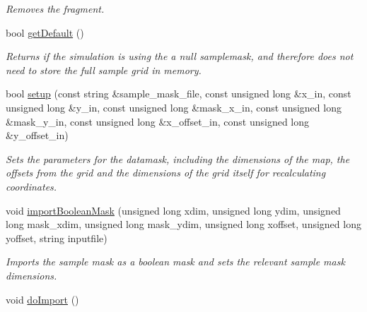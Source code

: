 \begin{DoxyCompactItemize}
\begin{DoxyCompactList}\small\item\em Removes the fragment. \end{DoxyCompactList}\item 
bool \hyperlink{class_data_mask_a093364b6da9442f7c4945b5a06cfe3af}{get\+Default} ()
\begin{DoxyCompactList}\small\item\em Returns if the simulation is using the a null samplemask, and therefore does not need to store the full sample grid in memory. \end{DoxyCompactList}\item 
bool \hyperlink{class_data_mask_a73922a90e7f491ec3dcf90fdd400fdf8}{setup} (const string \&sample\+\_\+mask\+\_\+file, const unsigned long \&x\+\_\+in, const unsigned long \&y\+\_\+in, const unsigned long \&mask\+\_\+x\+\_\+in, const unsigned long \&mask\+\_\+y\+\_\+in, const unsigned long \&x\+\_\+offset\+\_\+in, const unsigned long \&y\+\_\+offset\+\_\+in)
\begin{DoxyCompactList}\small\item\em Sets the parameters for the datamask, including the dimensions of the map, the offsets from the grid and the dimensions of the grid itself for recalculating coordinates. \end{DoxyCompactList}\item 
void \hyperlink{class_data_mask_a819eacf6968b0384a0221599dac09122}{import\+Boolean\+Mask} (unsigned long xdim, unsigned long ydim, unsigned long mask\+\_\+xdim, unsigned long mask\+\_\+ydim, unsigned long xoffset, unsigned long yoffset, string inputfile)
\begin{DoxyCompactList}\small\item\em Imports the sample mask as a boolean mask and sets the relevant sample mask dimensions. \end{DoxyCompactList}\item 
void \hyperlink{class_data_mask_a85f7b85bb4ac54aa884a8a06f1d35d1b}{do\+Import} ()\hypertarget{class_data_mask_a85f7b85bb4ac54aa884a8a06f1d35d1b}{}\label{class_data_mask_a85f7b85bb4ac54aa884a8a06f1d35d1b}


\end{DoxyCompactItemize}
